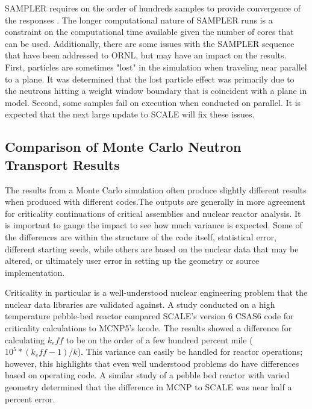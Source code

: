 
SAMPLER requires on the order of hundreds samples to provide convergence of the responses \cite{SCALE}. The longer computational nature of SAMPLER runs is a constraint on the computational time available given the number of cores that can be used. Additionally, there are some issues with the SAMPLER sequence that have been addressed to ORNL, but may have an impact on the results. First, particles are sometimes "lost" in the simulation when traveling near parallel to a plane. It was determined that the lost particle effect was primarily due to the neutrons hitting a weight window boundary that is coincident with a plane in model. Second, some samples fail on execution when conducted on parallel. It is expected that the next large update to SCALE will fix these issues. 

\subsection{Comparison of Monte Carlo Neutron Transport Results}

The results from a Monte Carlo simulation often produce slightly different results when produced with different codes.The outputs are generally in more agreement for criticality continuations of critical assemblies and nuclear reactor analysis. 
It is important to gauge the impact to see how much variance is expected. 
Some of the differences are within the structure of the code itself, statistical error, different starting seeds, while others are based on the nuclear data that may be altered, or ultimately user error in setting up the geometry or source implementation. %

Criticality in particular is a well-understood nuclear engineering problem that the nuclear data libraries are validated against. 
A study conducted on a high temperature pebble-bed reactor compared SCALE's version 6 CSAS6 code for criticality calculations to MCNP5's kcode\cite{Wang2014}. 
The results showed a difference for calculating $k_eff$ to be on the order of a few hundred percent mile ($10^{5}*(k{_eff}-1)/k$). 
This variance can easily be handled for reactor operations; however, this highlights that even well understood problems do have differences based on operating code. 
A similar study of a pebble bed reactor with varied geometry determined that the difference in MCNP to SCALE was near half a percent error\cite{Johnson2007}. %

